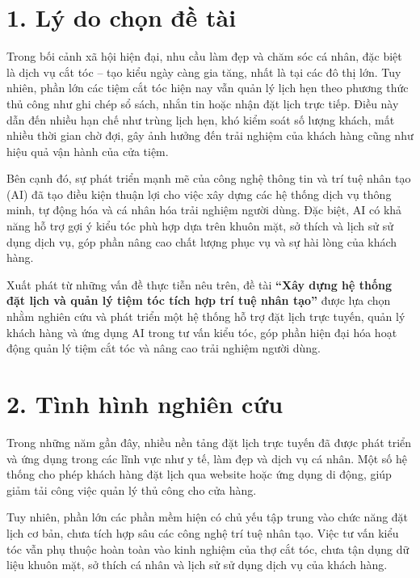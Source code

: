 
\section*{1. Lý do chọn đề tài}
Trong bối cảnh xã hội hiện đại, nhu cầu làm đẹp và chăm sóc cá nhân, đặc biệt là dịch vụ cắt tóc – tạo kiểu ngày càng gia tăng, nhất là tại các đô thị lớn. Tuy nhiên, phần lớn các tiệm cắt tóc hiện nay vẫn quản lý lịch hẹn theo phương thức thủ công như ghi chép sổ sách, nhắn tin hoặc nhận đặt lịch trực tiếp. Điều này dẫn đến nhiều hạn chế như trùng lịch hẹn, khó kiểm soát số lượng khách, mất nhiều thời gian chờ đợi, gây ảnh hưởng đến trải nghiệm của khách hàng cũng như hiệu quả vận hành của cửa tiệm.

Bên cạnh đó, sự phát triển mạnh mẽ của công nghệ thông tin và trí tuệ nhân tạo (AI) đã tạo điều kiện thuận lợi cho việc xây dựng các hệ thống dịch vụ thông minh, tự động hóa và cá nhân hóa trải nghiệm người dùng. Đặc biệt, AI có khả năng hỗ trợ gợi ý kiểu tóc phù hợp dựa trên khuôn mặt, sở thích và lịch sử sử dụng dịch vụ, góp phần nâng cao chất lượng phục vụ và sự hài lòng của khách hàng.

Xuất phát từ những vấn đề thực tiễn nêu trên, đề tài \textbf{``Xây dựng hệ thống đặt lịch và quản lý tiệm tóc tích hợp trí tuệ nhân tạo''} được lựa chọn nhằm nghiên cứu và phát triển một hệ thống hỗ trợ đặt lịch trực tuyến, quản lý khách hàng và ứng dụng AI trong tư vấn kiểu tóc, góp phần hiện đại hóa hoạt động quản lý tiệm cắt tóc và nâng cao trải nghiệm người dùng.

\section*{2. Tình hình nghiên cứu}
Trong những năm gần đây, nhiều nền tảng đặt lịch trực tuyến đã được phát triển và ứng dụng trong các lĩnh vực như y tế, làm đẹp và dịch vụ cá nhân. Một số hệ thống cho phép khách hàng đặt lịch qua website hoặc ứng dụng di động, giúp giảm tải công việc quản lý thủ công cho cửa hàng.

Tuy nhiên, phần lớn các phần mềm hiện có chủ yếu tập trung vào chức năng đặt lịch cơ bản, chưa tích hợp sâu các công nghệ trí tuệ nhân tạo. Việc tư vấn kiểu tóc vẫn phụ thuộc hoàn toàn vào kinh nghiệm của thợ cắt tóc, chưa tận dụng dữ liệu khuôn mặt, sở thích cá nhân và lịch sử sử dụng dịch vụ của khách hàng.

